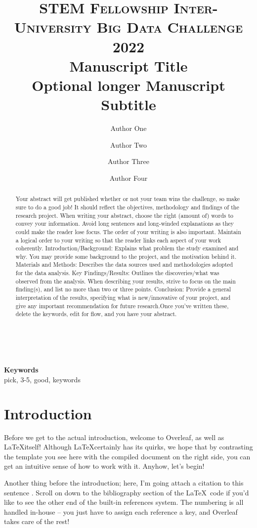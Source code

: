 \documentclass[12pt,twocolumn,letterpaper]{article}
\title{
		\usefont{OT1}{bch}{b}{n}
		\normalfont \normalsize \textsc{STEM Fellowship Inter-University Big Data Challenge 2022} \\ [10pt]
		\huge Manuscript Title \\
		\normalsize Optional longer Manuscript Subtitle \\
}
\author[1]{Author One}
\author[1]{Author Two}
\author[1]{Author Three}
\author[2]{Author Four}
\affil[1]{One University}
\affil[2]{B University}
\begin{document}
\maketitle

\begin{abstract}
Your abstract will get published whether or not your team wins the challenge, so make sure to do a good job! It should reflect the objectives, methodology and findings of the research project. When writing your abstract, choose the right (amount of) words to convey your information. Avoid long sentences and long-winded explanations as they could make the reader lose focus. The order of your writing is also important. Maintain a logical order to your writing so that the reader links each aspect of your work coherently. Introduction/Background: Explains what problem the study examined and why. You may provide some background to the project, and the motivation behind it. Materials and Methods: Describes the data sources used and methodologies adopted for the data analysis. Key Findings/Results: Outlines the discoveries/what was observed from the analysis. When describing your results, strive to focus on the main finding(s), and list no more than two or three points. Conclusion: Provide a general interpretation of the results, specifying what is new/innovative of your project, and give any important recommendation for future research.Once you've written these, delete the keywords, edit for flow, and you have your abstract.
\end{abstract} \\ 
\\ 
{\textbf{Keywords} \\
pick, 3-5, good, keywords}

\section{Introduction}
Before we get to the actual introduction, welcome to Overleaf, as well as \LaTeX itself! Although \LaTeX certainly has its quirks, we hope that by contrasting the template you see here with the compiled document on the right side, you can get an intuitive sense of how to work with it. Anyhow, let's begin!

Another thing before the introduction; here, I'm going attach a citation to this sentence \cite{ReferenceName}. Scroll on down to the bibliography section of the \LaTeX\ code if you'd like to see the other end of the built-in references system. The numbering is all handled in-house -- you just have to assign each reference a key, and Overleaf takes care of the rest!
\end{document}
